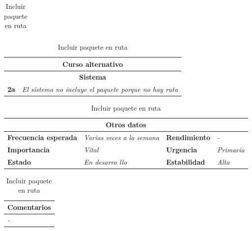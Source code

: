 \documentclass[12pt,spanish]{article}
\begin{document}
\begin{table}[H]
\begin{tabular}{|m{5pt}|m{7.33cm}|m{5pt}|m{7.33cm}|}
		
	\end{tabular}
	
	\vspace{0.5cm}
	
	\begin{tabular}{|m{12pt}|m{15.5cm}|}
		\hline
		\multicolumn{2}{|c|}{\textbf{Curso alternativo}} \\
		\hline
		\multicolumn{2}{|c|}{\textbf{Sistema}} \\
		\hline
		\textbf{2a} & \textit{El sistema no incluye el paquete porque no hay ruta} \\
		\hline
	
		
	\end{tabular}
	
	\vspace{0.5cm}
	
	\begin{tabular}{|m{3.75cm}|m{3.75cm}|m{3.75cm}|m{3.8cm}|}
		\hline
		\multicolumn{4}{|c|}{\textbf{Otros datos}} \\
		\hline
		\textbf{Frecuencia esperada} & \textit{Varias veces a la semana} & \textbf{Rendimiento} & \textit{-} \\
		\hline
		\textbf{Importancia} & \textit{Vital} & \textbf{Urgencia} & \textit{Primaria} \\
		\hline
		\textbf{Estado} & \textit{En desarro
		llo} & \textbf{Estabilidad} & \textit{Alta} \\
		\hline
	\end{tabular}
	
	\vspace{1cm}
	
	\begin{tabular}{|m{16.2cm}|}
		\hline
		\textbf{Comentarios} \\
		\hline
		\textit{-} \\
		\hline
	\end{tabular}
	
	\caption{Incluir paquete en ruta}
	
\end{table}
\end{document}
